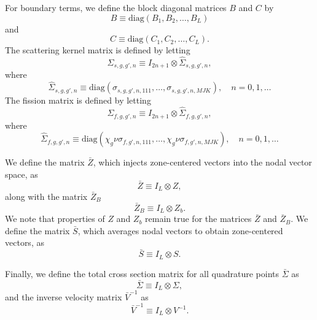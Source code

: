 For boundary terms, we define the block diagonal matrices $B$ and $C$ by
\begin{equation}
	B \equiv \text{diag}(B_{1}, B_{2}, \dots, B_{L})
\end{equation}
and
\begin{equation}
	C \equiv \text{diag}(C_{1}, C_{2}, \dots, C_{L}).
\end{equation}
The scattering kernel matrix is defined by letting
\begin{equation}
	\Sigma_{s,g,g',n} \equiv I_{2n+1} \otimes \hat{\Sigma}_{s,g,g',n},
\end{equation}
where
\begin{equation}
	\hat{\Sigma}_{s,g,g',n} \equiv \text{diag}(\sigma_{s,g,g',n,111}, \dots, \sigma_{s,g,g',n,MJK}), \quad n = 0,1, \dots
\end{equation}
The fission matrix is defined by letting
\begin{equation}
	\Sigma_{f,g,g',n} \equiv I_{2n+1} \otimes \hat{\Sigma}_{f,g,g',n},
\end{equation}
where
\begin{equation}
	\hat{\Sigma}_{f,g,g',n} \equiv \text{diag}(\chi_{g} \nu \sigma_{f,g',n,111}, \dots, \chi_{g} \nu \sigma_{f,g',n,MJK}), \quad n = 0,1, \dots
\end{equation}

We define the matrix $\bar{Z}$, which injects zone-centered vectors into the nodal vector space, as
\begin{equation}
	\bar{Z} \equiv I_{L} \otimes Z,
\end{equation}
 along with the matrix $\bar{Z}_{B}$
\begin{equation}
	\bar{Z}_{B} \equiv I_{L} \otimes Z_{b}.
\end{equation}
We note that properties of $Z$ and $Z_{b}$ remain true for the matrices $\bar{Z}$ and $\bar{Z}_{B}$. We define the matrix $\bar{S}$, which averages nodal vectors to obtain zone-centered vectors, as
\begin{equation}
	\bar{S} \equiv I_{L} \otimes S.
\end{equation}

Finally, we define the total cross section matrix for all quadrature points $\bar{\Sigma}$ as
\begin{equation}
	\bar{\Sigma} \equiv I_{L} \otimes \Sigma,
\end{equation}
and the inverse velocity matrix $\bar{V}^{-1}$ as
\begin{equation}
	\bar{V}^{-1} \equiv I_{L} \otimes V^{-1}.
\end{equation}

